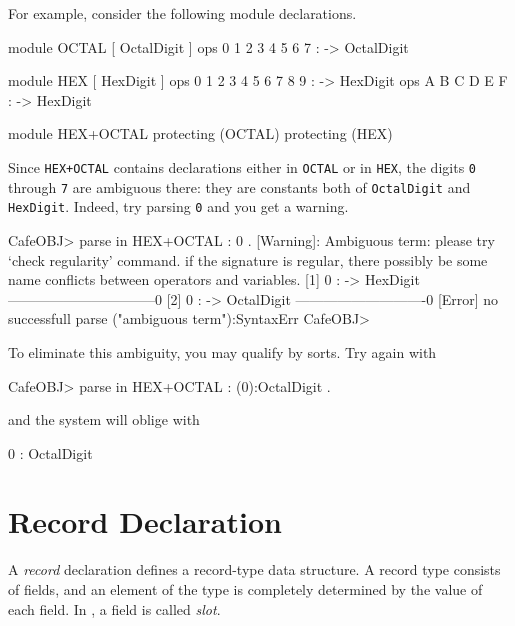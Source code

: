 \documentclass[a4paper]{memoir}
\begin{document}
For example, consider the following module declarations.
\begin{vvtm}
\begin{ccode}
  module OCTAL {
    [ OctalDigit ]
    ops 0 1 2 3 4 5 6 7 : -> OctalDigit
  }

  module HEX {
    [ HexDigit ]
    ops 0 1 2 3 4 5 6 7 8 9 : -> HexDigit
    ops A B C D E F : -> HexDigit
  }

  module HEX+OCTAL {
    protecting (OCTAL)
    protecting (HEX)
  }
\end{ccode}
\end{vvtm}
Since \verb|HEX+OCTAL| contains declarations either in \verb|OCTAL| or in
\verb|HEX|, the digits \verb|0| through \verb|7| are ambiguous there:
they are constants both of \verb|OctalDigit| and \verb|HexDigit|.
Indeed, try parsing \verb|0| and you get a warning.
\begin{vvtm}
\begin{ccode}
  CafeOBJ> parse in HEX+OCTAL : 0 .
  [Warning]: Ambiguous term:
      please try `check regularity' command.
      if the signature is regular, there possibly be 
      some name conflicts between operators and variables.
  [1] 0 :  -> HexDigit --------------------------------0
  [2] 0 :  -> OctalDigit ----------------------------0
  [Error] no successfull parse
    ("ambiguous term"):SyntaxErr
  CafeOBJ> 
\end{ccode}
\end{vvtm}
To eliminate this ambiguity, you may qualify by sorts. Try again with
\begin{vvtm}
\begin{ccode}
  CafeOBJ> parse in HEX+OCTAL : (0):OctalDigit .
\end{ccode}
\end{vvtm}
and the system will oblige with
\begin{vvtm}
\begin{ccode}
  0 : OctalDigit
\end{ccode}
\end{vvtm}
\section{Record Declaration}\label{sec:p2-record-declaration}

A {\em record} declaration defines a record-type
data structure. A record type consists of fields, and an element of the
type is completely determined by the value of each field.
In \cafeobj, a field is called {\em slot}.
\end{document}
